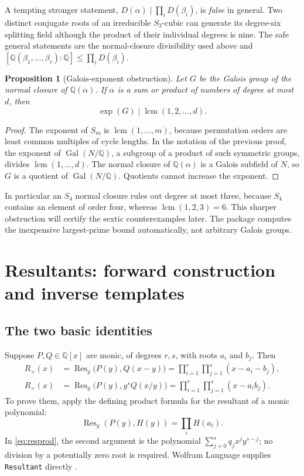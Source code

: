 \documentclass[11pt,letterpaper]{article}
\newtheorem{proposition}[theorem]{Proposition}
\theoremstyle{definition}
\theoremstyle{remark}
\newcommand{\Q}{\mathbb Q}
\newcommand{\Gal}{\operatorname{Gal}}
\newcommand{\Res}{\operatorname{Res}}
\newcommand{\wl}[1]{\texttt{#1}}
\begin{document}
A tempting stronger statement, \(D(\alpha)\mid\prod_i D(\beta_i)\), is
\emph{false} in general. Two distinct conjugate roots of an irreducible
\(S_3\)-cubic can generate its degree-six splitting field although the
product of their individual degrees is nine. The safe general statements
are the normal-closure divisibility used above and
\([\Q(\beta_1,\ldots,\beta_r):\Q]\leq\prod_iD(\beta_i)\).

\begin{proposition}[Galois-exponent obstruction]\label{prop:exponent}
Let \(G\) be the Galois group of the normal closure of \(\Q(\alpha)\).
If \(\alpha\) is a sum or product of numbers of degree at most \(d\), then
\[
 \exp(G)\mid\operatorname{lcm}(1,2,\ldots,d).
\]
\end{proposition}
\begin{proof}
The exponent of \(S_m\) is \(\operatorname{lcm}(1,\ldots,m)\), because
permutation orders are least common multiples of cycle lengths. In the
notation of the previous proof, the exponent of \(\Gal(N/\Q)\), a
subgroup of a product of such symmetric groups, divides
\(\operatorname{lcm}(1,\ldots,d)\). The normal closure of
\(\Q(\alpha)\) is a Galois subfield of \(N\), so \(G\) is a quotient
of \(\Gal(N/\Q)\). Quotients cannot increase the exponent.
\end{proof}
In particular an \(S_4\) normal closure rules out degree at most three,
because \(S_4\) contains an element of order four, whereas
\(\operatorname{lcm}(1,2,3)=6\). This sharper obstruction will certify the
sextic counterexamples later. The package computes the inexpensive
largest-prime bound automatically, not arbitrary Galois groups.

\section{Resultants: forward construction and inverse templates}
\label{sec:resultants}
\subsection{The two basic identities}
Suppose \(P,Q\in\Q[x]\) are monic, of degrees \(r,s\), with roots
\(a_i\) and \(b_j\). Then
\begin{align}
 R_+(x)&=\Res_y\bigl(P(y),Q(x-y)\bigr)
       =\prod_{i=1}^{r}\prod_{j=1}^{s}(x-a_i-b_j),\label{eq:ressum}\\
 R_\times(x)&=\Res_y\bigl(P(y),y^sQ(x/y)\bigr)
       =\prod_{i=1}^{r}\prod_{j=1}^{s}(x-a_i b_j).\label{eq:resprod}
\end{align}
To prove them, apply the defining product formula for the resultant of a
monic polynomial:
\[\Res_y(P(y),H(y))=\prod_i H(a_i).\]
In \eqref{eq:resprod}, the second argument is the polynomial
\(\sum_{j=0}^{s}q_jx^jy^{s-j}\); no division by a potentially zero root
is required. Wolfram Language supplies \wl{Resultant} directly
\cite{resultant}.
\end{document}
